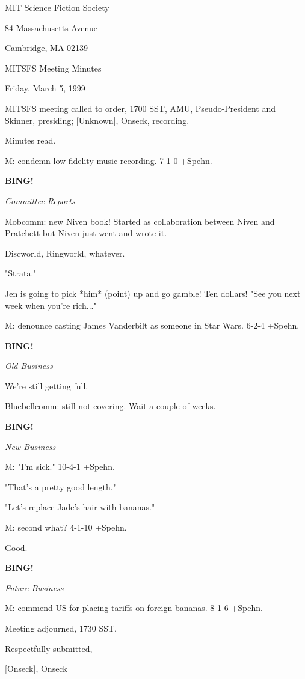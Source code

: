 \documentclass[12pt]{article}
\newcommand{\bing}{{\bf BING!} }
\newcommand{\goto}[1]{\bing \vskip 12pt \centerline{{\em{#1}}}}
\begin{document}
\begin{center}

MIT Science Fiction Society 

84 Massachusetts Avenue

Cambridge, MA 02139

\vspace{12pt}

MITSFS Meeting Minutes 

Friday, March 5, 1999

\end{center}
 
\vspace{18pt}

\setlength{\parskip}{6pt}

\noindent
MITSFS meeting called to order, 1700 SST,
AMU, Pseudo-President and Skinner, presiding; [Unknown], Onseck, recording.

Minutes read.

M: condemn low fidelity music recording. 7-1-0 +Spehn.

\goto{Committee Reports}

Mobcomm: new Niven book! Started as collaboration between Niven and Pratchett but Niven just went and wrote it.

Discworld, Ringworld, whatever.

"Strata."

Jen is going to pick *him* (point) up and go gamble! Ten dollars! "See you next week when you're rich..."

M: denounce casting James Vanderbilt as someone in Star Wars. 6-2-4 +Spehn.

\goto{Old Business}

We're still getting full.

Bluebellcomm: still not covering. Wait a couple of weeks.

\goto{New Business}

M: "I'm sick." 10-4-1 +Spehn.

"That's a pretty good length."

"Let's replace Jade's hair with bananas."

M: second what? 4-1-10 +Spehn.

Good.

\goto{Future Business}

M: commend US for placing tariffs on foreign bananas. 8-1-6 +Spehn.

\vspace{12pt}

\noindent
Meeting adjourned, 1730 SST.

\vspace{18pt}

\centerline{Respectfully submitted,}
\centerline{[Onseck], Onseck}
\end{document}
